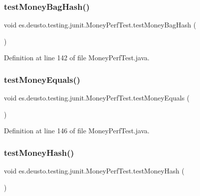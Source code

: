 \subsubsection{\texorpdfstring{testMoneyBagHash()}{testMoneyBagHash()}}
{\footnotesize\ttfamily void es.\+deusto.\+testing.\+junit.\+Money\+Perf\+Test.\+test\+Money\+Bag\+Hash (\begin{DoxyParamCaption}{ }\end{DoxyParamCaption})}



Definition at line 142 of file Money\+Perf\+Test.\+java.

\mbox{\label{classes_1_1deusto_1_1testing_1_1junit_1_1_money_perf_test_a2f32dcc28421475a7ee1b619dfe2facd}} 
\subsubsection{\texorpdfstring{testMoneyEquals()}{testMoneyEquals()}}
{\footnotesize\ttfamily void es.\+deusto.\+testing.\+junit.\+Money\+Perf\+Test.\+test\+Money\+Equals (\begin{DoxyParamCaption}{ }\end{DoxyParamCaption})}



Definition at line 146 of file Money\+Perf\+Test.\+java.

\mbox{\label{classes_1_1deusto_1_1testing_1_1junit_1_1_money_perf_test_aa767ffb2c597b59ce5ef8bd04326b687}} 
\subsubsection{\texorpdfstring{testMoneyHash()}{testMoneyHash()}}
{\footnotesize\ttfamily void es.\+deusto.\+testing.\+junit.\+Money\+Perf\+Test.\+test\+Money\+Hash (\begin{DoxyParamCaption}{ }\end{DoxyParamCaption})}



